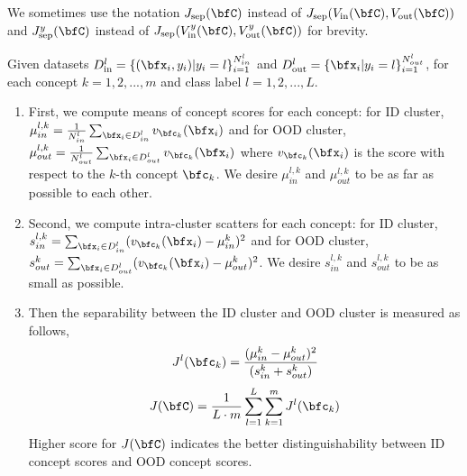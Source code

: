 
We sometimes use the notation $J_{\textrm{sep}}(\bfC)$ instead of $J_{\textrm{sep}}(V_{\textrm{in}}(\bfC), V_{\textrm{out}}(\bfC))$ and $J^y_{\textrm{sep}}(\bfC)$ instead of $J_{\textrm{sep}}(V^{y}_{\textrm{in}}(\bfC), V^{y}_{\textrm{out}}(\bfC))$ for brevity.



\iffalse


Given datasets $D_{\text{in}}^{l} = \{(\bfx_i, y_i) | y_i = l\}_{i=1}^{N_{in}^{l}}$ and $D_{\text{out}}^{l} = \{\bfx_i | y_i = l\}_{i=1}^{N_{out}^{l}}$, for each concept $k = 1, 2, ..., m$ and class label $l = 1, 2, ..., L$.
\begin{enumerate}
\item First, we compute means of concept scores for each concept: for ID cluster, $\mu_{in}^{l, k} = \frac{1}{N_{in}^l}\sum_{\bfx_i \in D^{l}_{in}} v_{\bfc_k}(\bfx_i)$ and for OOD cluster, $\mu_{out}^{l, k} = \frac{1}{N_{out}^l}\sum_{\bfx_i \in D^{l}_{out}} v_{\bfc_k}(\bfx_i)$ where $v_{\bfc_k}(\bfx_i)$ is the score with respect to the $k$-th concept $\bfc_k$.
We desire $\mu_{in}^{l, k}$ and $\mu_{out}^{l, k}$ to be as far as possible to each other.
\item Second, we compute intra-cluster scatters for each concept: for ID cluster, $s_{in}^{l, k} = \sum_{\bfx_i \in D^{l}_{in}} (v_{\bfc_k}(\bfx_i) - \mu_{in}^k)^2$ and for OOD cluster, $s_{out}^k = \sum_{\bfx_i \in D^{l}_{out}} (v_{\bfc_k}(\bfx_i) - \mu_{out}^k)^2$.
We desire $s_{in}^{l,k}$ and $s_{out}^{l,k}$ to be as small as possible.
\item Then the separability between the ID cluster and OOD cluster is measured as follows,
\begin{equation*}
    J^l(\bfc_k) = \frac{(\mu_{in}^k - \mu_{out}^k)^2}{(s_{in}^k + s_{out}^k)}
\end{equation*}
\begin{equation}
\label{equ: separability}
    J(\bfC) = \frac{1}{L \cdot m}\sum_{l=1}^L\sum_{k=1}^m J^l(\bfc_k)
\end{equation}
Higher score for $J(\bfC)$ indicates the better distinguishability between ID concept scores and OOD concept scores.
\end{enumerate}

